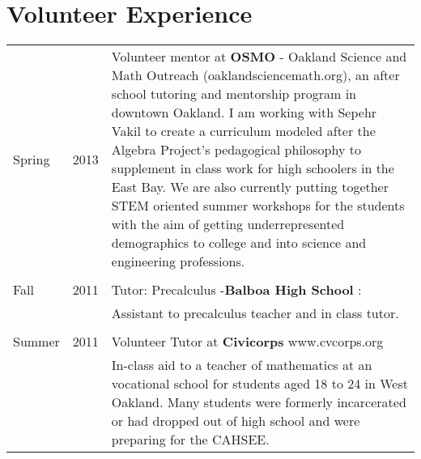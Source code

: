\documentclass[margin,line,pifont,palatino,courier]{res}
\begin{document}
\begin{resume}
\begin{tabular}{@{}p{0.75in}p{0.5in}p{4in}}
\end{tabular}

\section{Volunteer Experience}
\begin{tabular}{@{}p{0.75in}p{0.5in}p{4in}}
Spring & 2013 & Volunteer mentor at {\bf OSMO} - Oakland Science and Math Outreach (oaklandsciencemath.org), an after school tutoring and mentorship program  in downtown Oakland. 
									I am working with Sepehr Vakil to create a curriculum modeled after the Algebra Project's pedagogical philosophy to supplement in class work for high schoolers in the East Bay.  We are also currently putting together STEM oriented summer workshops for the students with the aim of getting underrepresented demographics to college and into science and engineering professions.  


\\ \\

Fall & 2011 &  Tutor: Precalculus  -{\bf Balboa High School}  :\\

& &  Assistant to precalculus teacher and in class tutor. \\ \\

Summer & 2011 & Volunteer Tutor at {\bf Civicorps} www.cvcorps.org  \\	

& & 		In-class aid to a teacher of mathematics at an vocational school for students aged 18 to 24 in West Oakland.  Many students were formerly incarcerated
or had dropped out of high school and were preparing for the CAHSEE.\\

\end{tabular}

\end{resume}
\end{document}
